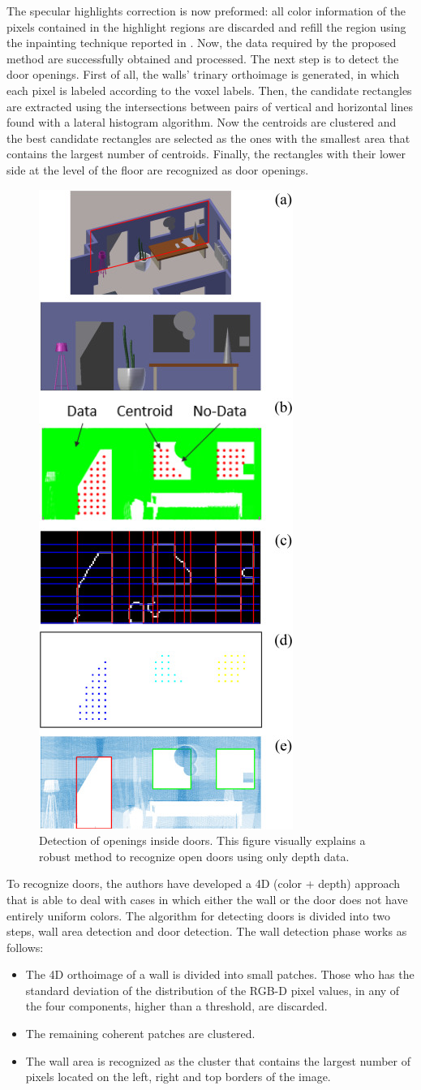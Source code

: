 The specular highlights correction is now preformed: all color information of the pixels contained in the highlight regions are discarded and refill the region using the inpainting technique reported in \cite{1467533}.
Now, the data required by the proposed method are successfully obtained and processed. The next step is to detect the door openings. First of all, the walls' trinary orthoimage is generated, in which each pixel is labeled according to the voxel labels. Then, the candidate rectangles are extracted using the intersections between pairs of vertical and horizontal lines found with a lateral histogram algorithm. Now the centroids are clustered and the
best candidate rectangles are selected as the ones with the smallest area that contains the largest number of centroids. Finally, the rectangles with their lower
side at the level of the floor are recognized as door openings.

\begin{figure}[h!]
	\centering
	\includegraphics[width=0.3\linewidth]{images/dooropening.jpg}
	\caption{Detection of openings inside doors. This figure visually explains a robust method to recognize open doors using only depth data.}
\end{figure}

To recognize doors, the authors have developed a 4D (color + depth) approach that is able to deal with cases in which either the wall or the door does not have entirely uniform colors. The algorithm for detecting doors is divided into two steps, wall area detection and door detection. The wall detection phase works as follows:
\begin{itemize}
	\item The 4D orthoimage of a wall is divided into small patches. Those who has the standard deviation of the distribution of the RGB-D pixel values, in any of the four components, higher than a threshold, are discarded. 
	\item The remaining coherent patches are clustered.
	\item The wall area is recognized as the cluster that contains the largest number of pixels located on the left, right and top borders of the image.
\end{itemize}

